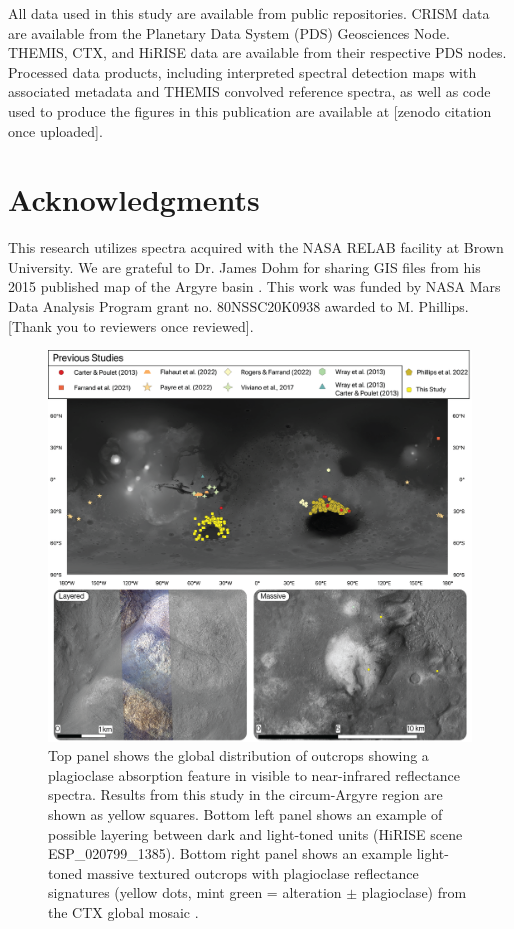 \documentclass[12pt]{article}
\begin{document}
All data used in this study are available from public repositories. CRISM data are available from the Planetary Data System (PDS) Geosciences Node. THEMIS, CTX, and HiRISE data are available from their respective PDS nodes. Processed data products, including interpreted spectral detection maps with associated metadata and THEMIS convolved reference spectra, as well as code used to produce the figures in this publication are available at [zenodo citation once uploaded].

\section*{Acknowledgments}

This research utilizes spectra acquired with the NASA RELAB facility at Brown University. We are grateful to Dr. James Dohm for sharing GIS files from his 2015 published map of the Argyre basin \citep{Dohm2015}. This work was funded by NASA Mars Data Analysis Program grant no. 80NSSC20K0938 awarded to M. Phillips. [Thank you to reviewers once reviewed].

 
 

\newpage

\begin{figure}
    \centering
    \includegraphics[width=\textwidth]
    {figures/01_Global_Context.png}
    \caption{Top panel shows the global distribution of outcrops showing a plagioclase absorption feature in visible to near-infrared reflectance spectra. Results from this study in the circum-Argyre region are shown as yellow squares. Bottom left panel shows an example of possible layering between dark and light-toned units (HiRISE scene ESP\_020799\_1385). Bottom right panel shows an example light-toned massive textured outcrops with plagioclase reflectance signatures (yellow dots, mint green = alteration $\pm$ plagioclase) from the CTX global mosaic \citep{Dickson2018}.}
    \label{fig:global_distribution}
\end{figure}
\end{document}
